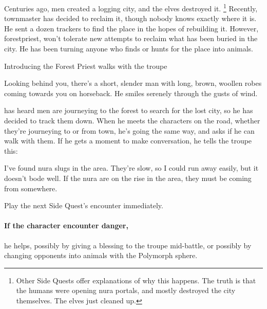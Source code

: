 \resumecontents[Town]
\resumecontents[Forest]

\label{herenofarther}

\stopcontents[Town]
\stopcontents[Forest]

\startcontents[sq]

\sqminitoc

\noindent
Centuries ago, men created a logging city, and the elves destroyed it.%
\footnote{Other Side Quests offer explanations of why this happens.
The truth is that the humans were opening nura portals, and mostly destroyed the city themselves.
The elves just cleaned up.} 
Recently, \gls{townmaster} has decided to reclaim it, though nobody knows exactly where it is.
He sent a dozen trackers to find the place in the hopes of rebuilding it.
However, \gls{forestpriest}, won't tolerate new attempts to reclaim what has been buried in the city.
He has been turning anyone who finds or hunts for the place into animals.

{\squash Introducing the Forest Priest}%
{ walks with the troupe}%

\begin{boxtext}

  Looking behind you, there's a short, slender man with long, brown, woollen robes coming towards you on horseback.
  He smiles serenely through the gusts of wind.

\end{boxtext}

 has heard men are journeying to the forest to search for the lost city, so he has decided to track them down.
When he meets the characters on the road, whether they're journeying to or from \gls{town}, he's going the same way, and asks if he can walk with them.
If he gets a moment to make conversation, he tells the troupe this:

\begin{speechtext}

  I've found nura slugs in the area.
  They're slow, so I could run away easily, but it doesn't bode well.
  If the nura are on the rise in the area, they must be coming from somewhere.

\end{speechtext}

Play the next Side Quest's encounter immediately.
\paragraph{If the character encounter danger,}
he helps, possibly by giving a blessing to the troupe mid-battle, or possibly by changing opponents into animals with the Polymorph sphere.

